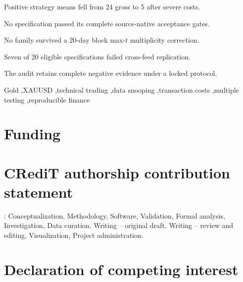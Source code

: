 \documentclass[a4paper,fleqn]{cas-sc}
\begin{document}
\begin{highlights}
\item Positive strategy means fell from 24 gross to 5 after severe costs.
\item No specification passed its complete source-native acceptance gates.
\item No family survived a 20-day block max-$t$ multiplicity correction.
\item Seven of 20 eligible specifications failed cross-feed replication.
\item The audit retains complete negative evidence under a locked protocol.
\end{highlights}

\begin{keywords}
Gold \sep XAUUSD \sep technical trading \sep data snooping \sep transaction costs \sep multiple testing \sep reproducible finance
\end{keywords}

\maketitle



\section*{Funding}
\FundingStatement

\section*{CRediT authorship contribution statement}
\AuthorName: Conceptualization, Methodology, Software, Validation, Formal analysis, Investigation, Data curation, Writing -- original draft, Writing -- review and editing, Visualization, Project administration.

\section*{Declaration of competing interest}
\InterestStatement
\end{document}
